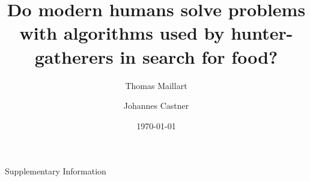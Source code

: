 \documentclass[12pt]{revtex4}
\begin{document}
\title{Do modern humans solve problems with algorithms used by hunter-gatherers in search for food?}

\author{Thomas Maillart}

\author{Johannes Castner}




\date{\today}


\begin{abstract}

\end{abstract}

\maketitle


%




%

\clearpage





\clearpage


\clearpage
%

\renewcommand\thesection{S\arabic{section}}
\setcounter{section}{0}

\renewcommand\theequation{S\arabic{equation}}
\setcounter{equation}{0}


\begin{center}
{\Large Supplementary Information}
\vspace{3cm}
\end{center}





\end{document}
